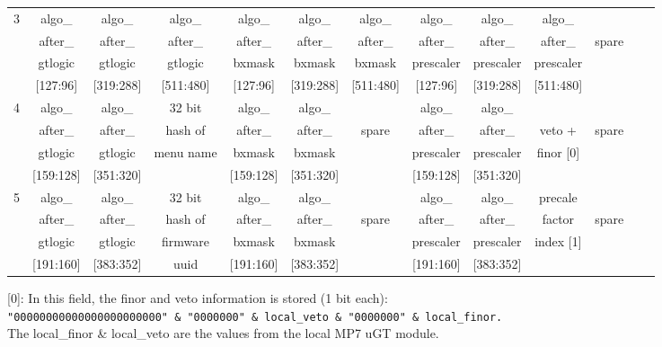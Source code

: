 \begin{table}[ht]
{\begin{tabular}{|c|c|c|c|c|c|c|c|c|c|c|c|c|}
3 & algo\_    & algo\_    & algo\_    & algo\_    & algo\_    & algo\_    & algo\_    & algo\_    & algo\_    &          \\
  & after\_   & after\_   & after\_   & after\_   & after\_   & after\_   & after\_   & after\_   & after\_   & spare    \\
  & gtlogic   & gtlogic   & gtlogic   & bxmask    & bxmask    & bxmask    & prescaler & prescaler & prescaler &          \\
  & [127:96]  & [319:288] & [511:480] & [127:96]  & [319:288] & [511:480] & [127:96]  & [319:288] & [511:480] &          \\\hline
4 & algo\_    & algo\_    & 32 bit    & algo\_    & algo\_    &           & algo\_    & algo\_    &           &          \\
  & after\_   & after\_   & hash of   & after\_   & after\_   & spare     & after\_   & after\_   & veto +    & spare    \\
  & gtlogic   & gtlogic   & menu name & bxmask    & bxmask    &           & prescaler & prescaler & finor [0] &          \\
  & [159:128] & [351:320] &           & [159:128] & [351:320] &           & [159:128] & [351:320] &           &          \\\hline
5 & algo\_    & algo\_    & 32 bit    & algo\_    & algo\_    &           & algo\_    & algo\_    & precale   &          \\
  & after\_   & after\_   & hash of   & after\_   & after\_   & spare     & after\_   & after\_   & factor    & spare    \\
  & gtlogic   & gtlogic   & firmware  & bxmask    & bxmask    &           & prescaler & prescaler & index [1] &          \\
  & [191:160] & [383:352] & uuid      & [191:160] & [383:352] &           & [191:160] & [383:352] &           &          \\\hline
\end{tabular}
}
\label{table:app:output_links} 
\end{table}
                                                                                                                                                         
[0]: In this field, the finor and veto information is stored (1 bit each):\\
\texttt{\small{"00000000000000000000000" \& "0000000" \& local\_veto \& "0000000" \& local\_finor.}}\\
The local\_finor \& local\_veto are the values from the local MP7 uGT module.  

